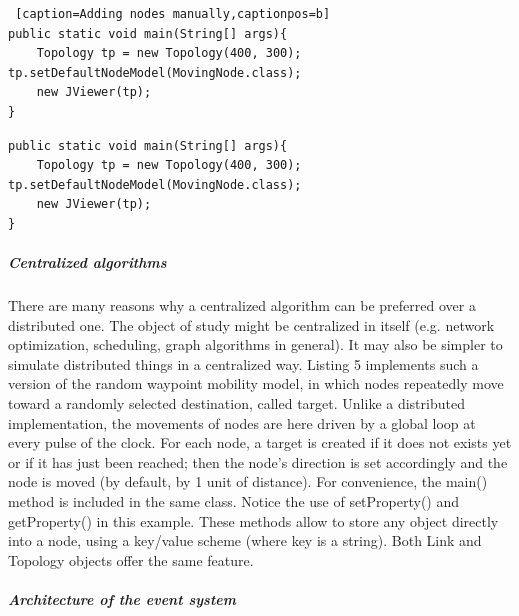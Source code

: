 \begin{lstlisting} [caption=Adding nodes manually,captionpos=b]
public static void main(String[] args){
	Topology tp = new Topology(400, 300); tp.setDefaultNodeModel(MovingNode.class);
	new JViewer(tp);
}
\end{lstlisting}

\begin{lstlisting}[caption=Using a defined node as default, captionpos=b]
public static void main(String[] args){
	Topology tp = new Topology(400, 300); tp.setDefaultNodeModel(MovingNode.class);
	new JViewer(tp);
}
\end{lstlisting}


\subparagraph{Centralized algorithms}There are many reasons why a centralized algorithm can be preferred over a distributed one. The object of study might be centralized in itself (e.g. network optimization, scheduling, graph algorithms in general). It may also be simpler to simulate distributed things in a centralized way. Listing 5 implements such a version of the random waypoint mobility model, in which nodes repeatedly move toward a randomly selected destination, called target. Unlike a distributed implementation, the movements of nodes are here driven by a global loop at every pulse of the clock. For each node, a target is created if it does not exists yet or if it has just been reached; then the node’s direction is set accordingly and the node is moved (by default, by 1 unit of distance). For convenience, the main() method is included in the same class. Notice the use of setProperty() and getProperty() in this example. These methods allow to store any object directly into a node, using a key/value scheme (where key is a string). Both Link and Topology objects offer the same feature.
\subparagraph{Architecture of the event system}
